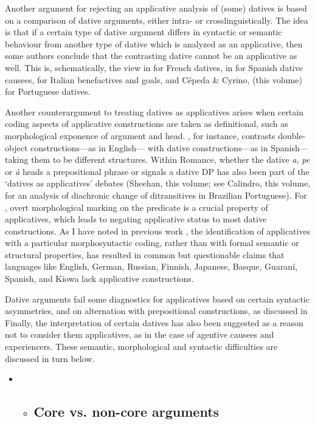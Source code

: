 \documentclass[output=paper,modfonts,nonflat]{langsci/langscibook}
\begin{document}
Another argument for rejecting an applicative analysis of (some) datives is based on a comparison of dative arguments, either intra- or crosslinguistically. The idea is that if a certain type of dative argument differs in syntactic or semantic behaviour from another type of dative which is analyzed as an applicative, then some authors conclude that the contrasting dative cannot be an applicative as well. This is, schematically, the view in \citealt{BonehNash2012} for French datives, in \citet{Tubino2012} for Spanish dative causees, \citet{FolliHarley2006} for Italian benefactives and goals, and Cépeda \& Cyrino, (this volume) for Portuguese datives. 

Another counterargument to treating datives as applicatives arises when certain coding aspects of applicative constructions are taken as definitional, such as morphological exponence of argument and head. \citet{Snyder1995}, for instance, contrasts double-object constructions—as in English— with dative constructions—as in Spanish— taking them to be different structures. Within Romance, whether the dative \textit{a,} \textit{pe} or \textit{à} heads a prepositional phrase or signals a dative DP has also been part of the ‘datives as applicatives’ debates (Sheehan, this volume; see Calindro, this volume, for an analysis of diachronic change of ditransitives in Brazilian Portuguese). For \citet{Polinsky2013}, overt morphological marking on the predicate is a crucial property of applicatives, which leads to negating applicative status to most dative constructions. As I have noted in previous work \citep[131]{Cuervo2015a}, the identification of applicatives with a particular morphosyntactic coding, rather than with formal semantic or structural properties, has resulted in common but questionable claims that languages like English, German, Russian, Finnish, Japanese, Basque, Guaraní, Spanish, and Kiowa lack applicative constructions.

Dative arguments fail some diagnostics for applicatives based on certain syntactic asymmetries, and on alternation with prepositional constructions, as discussed in  Finally, the interpretation of certain datives has also been suggested as a reason not to consider them applicatives, as in the case of agentive causees \citep{Tubino2012} and experiencers.  These semantic, morphological and syntactic difficulties are discussed in turn below. 

\begin{itemize}
\item \begin{itemize}
\item \subsection{Core vs. non-core arguments}
\end{itemize}
\end{itemize}
\end{document}
